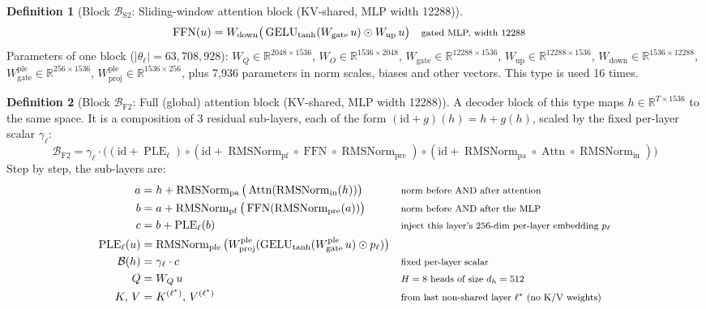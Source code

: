 \documentclass[10pt,a4paper]{article}
\newcommand{\op}[1]{\operatorname{#1}}
\theoremstyle{definition}
\newtheorem{definition}{Definition}[section]
\begin{document}
\begin{definition}[Block $\mathcal{B}_{\mathrm{S2}}$: Sliding-window attention block (KV-shared, MLP width 12288)]
\begin{align*}
  \op{FFN}(u) &= W_{\mathrm{down}}\big(\op{GELU}_{\tanh}(W_{\mathrm{gate}}\,u)\odot W_{\mathrm{up}}\,u\big) && \text{\footnotesize gated MLP, width 12288}
\end{align*}
Parameters of one block ($|\theta_\ell|=63{,}708{,}928$): $W_Q\in\mathbb{R}^{2048\times1536}$, $W_O\in\mathbb{R}^{1536\times2048}$, $W_{\mathrm{gate}}\in\mathbb{R}^{12288\times1536}$, $W_{\mathrm{up}}\in\mathbb{R}^{12288\times1536}$, $W_{\mathrm{down}}\in\mathbb{R}^{1536\times12288}$, $W^{\mathrm{ple}}_{\mathrm{gate}}\in\mathbb{R}^{256\times1536}$, $W^{\mathrm{ple}}_{\mathrm{proj}}\in\mathbb{R}^{1536\times256}$, plus 7,936 parameters in norm scales, biases and other vectors. This type is used 16 times.
\end{definition}
\begin{definition}[Block $\mathcal{B}_{\mathrm{F2}}$: Full (global) attention block (KV-shared, MLP width 12288)]
A decoder block of this type maps $h\in\mathbb{R}^{T\times 1536}$ to the same space. It is a composition of 3 residual sub-layers, each of the form $(\mathrm{id}+g)(h)=h+g(h)$, scaled by the fixed per-layer scalar $\gamma_\ell$:
\begin{equation}
  \mathcal{B}_{\mathrm{F2}} = \gamma_\ell\cdot\big((\mathrm{id}+\op{PLE}_\ell)\circ(\mathrm{id}+\op{RMSNorm}_{\mathrm{pf}}\circ\op{FFN}\circ \op{RMSNorm}_{\mathrm{pre}})\circ(\mathrm{id}+\op{RMSNorm}_{\mathrm{pa}}\circ \op{Attn}\circ \op{RMSNorm}_{\mathrm{in}})\big)
\end{equation}
Step by step, the sub-layers are:
\begin{align*}
  a &= h + \op{RMSNorm}_{\mathrm{pa}}\big(\op{Attn}(\op{RMSNorm}_{\mathrm{in}}(h))\big) && \text{\footnotesize norm before AND after attention} \\
  b &= a + \op{RMSNorm}_{\mathrm{pf}}\big(\op{FFN}(\op{RMSNorm}_{\mathrm{pre}}(a))\big) && \text{\footnotesize norm before AND after the MLP} \\
  c &= b + \op{PLE}_\ell(b) && \text{\footnotesize inject this layer's 256-dim per-layer embedding $p_\ell$} \\
  \op{PLE}_\ell(u) &= \op{RMSNorm}_{\mathrm{ple}}\big(W^{\mathrm{ple}}_{\mathrm{proj}}(\op{GELU}_{\tanh}(W^{\mathrm{ple}}_{\mathrm{gate}}\,u)\odot p_\ell)\big) \\
  \mathcal{B}(h) &= \gamma_\ell\cdot c && \text{\footnotesize fixed per-layer scalar} \\
  Q &= W_Q\,u && \text{\footnotesize $H=8$ heads of size $d_h=512$} \\
  K,\,V &= K^{(\ell^*)},\,V^{(\ell^*)} && \text{\footnotesize from last non-shared layer $\ell^*$ (no K/V weights)} \\

\end{align*}
\end{definition}
\end{document}
